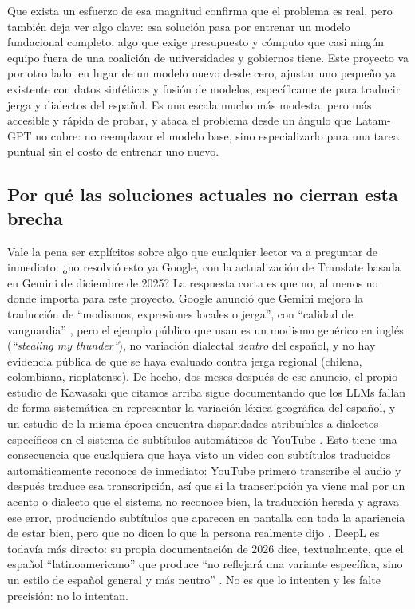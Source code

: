 \documentclass[11pt,a4paper]{article}
\begin{document}
Que exista un esfuerzo de esa magnitud confirma que el problema es real, pero también deja ver algo clave: esa solución pasa por entrenar un modelo fundacional completo, algo que exige presupuesto y cómputo que casi ningún equipo fuera de una coalición de universidades y gobiernos tiene. Este proyecto va por otro lado: en lugar de un modelo nuevo desde cero, ajustar uno pequeño ya existente con datos sintéticos y fusión de modelos, específicamente para traducir jerga y dialectos del español. Es una escala mucho más modesta, pero más accesible y rápida de probar, y ataca el problema desde un ángulo que Latam-GPT no cubre: no reemplazar el modelo base, sino especializarlo para una tarea puntual sin el costo de entrenar uno nuevo.

\subsection{Por qué las soluciones actuales no cierran esta brecha}

Vale la pena ser explícitos sobre algo que cualquier lector va a preguntar de inmediato: ¿no resolvió esto ya Google, con la actualización de Translate basada en Gemini de diciembre de 2025? La respuesta corta es que no, al menos no donde importa para este proyecto. Google anunció que Gemini mejora la traducción de ``modismos, expresiones locales o jerga'', con ``calidad de vanguardia'' \cite{googleblog2025gemini}, pero el ejemplo público que usan es un modismo genérico en inglés (\textit{``stealing my thunder''}), no variación dialectal \textit{dentro} del español, y no hay evidencia pública de que se haya evaluado contra jerga regional (chilena, colombiana, rioplatense). De hecho, dos meses después de ese anuncio, el propio estudio de Kawasaki que citamos arriba \cite{kawasaki2026bias} sigue documentando que los LLMs fallan de forma sistemática en representar la variación léxica geográfica del español, y un estudio de la misma época encuentra disparidades atribuibles a dialectos específicos en el sistema de subtítulos automáticos de YouTube \cite{jimenez2026youtube}. Esto tiene una consecuencia que cualquiera que haya visto un video con subtítulos traducidos automáticamente reconoce de inmediato: YouTube primero transcribe el audio y después traduce esa transcripción, así que si la transcripción ya viene mal por un acento o dialecto que el sistema no reconoce bien, la traducción hereda y agrava ese error, produciendo subtítulos que aparecen en pantalla con toda la apariencia de estar bien, pero que no dicen lo que la persona realmente dijo \cite{linglass2026youtube}. DeepL es todavía más directo: su propia documentación de 2026 dice, textualmente, que el español ``latinoamericano'' que produce ``no reflejará una variante específica, sino un estilo de español general y más neutro'' \cite{deepl2026help}. No es que lo intenten y les falte precisión: no lo intentan.
\end{document}
